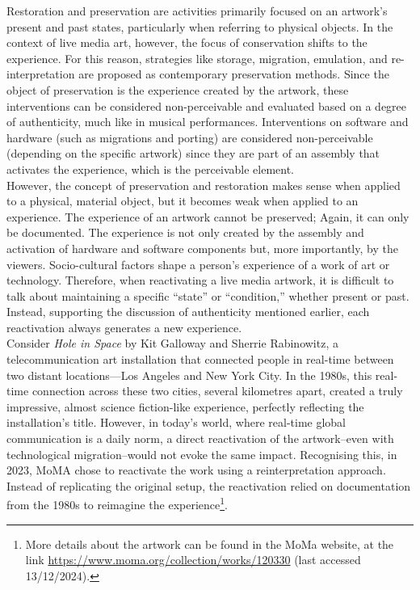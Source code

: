 Restoration and preservation are activities primarily focused on an artwork's present and past states, particularly when referring to physical objects. In the context of live media art, however, the focus of conservation shifts to the experience. For this reason, strategies like storage, migration, emulation, and re-interpretation are proposed as contemporary preservation methods. Since the object of preservation is the experience created by the artwork, these interventions can be considered non-perceivable and evaluated based on a degree of authenticity, much like in musical performances. Interventions on software and hardware (such as migrations and porting) are considered non-perceivable (depending on the specific artwork) since they are part of an assembly that activates the experience, which is the perceivable element.\\
However, the concept of preservation and restoration makes sense when applied to a physical, material object, but it becomes weak when applied to an experience. The experience of an artwork cannot be preserved; Again, it can only be documented. The experience is not only created by the assembly and activation of hardware and software components but, more importantly, by the viewers. Socio-cultural factors shape a person's experience of a work of art or technology. Therefore, when reactivating a live media artwork, it is difficult to talk about maintaining a specific ``state'' or ``condition,'' whether present or past. Instead, supporting the discussion of authenticity mentioned earlier, each reactivation always generates a new experience.\\
Consider \textit{Hole in Space} by Kit Galloway and Sherrie Rabinowitz, a telecommunication art installation that connected people in real-time between two distant locations—Los Angeles and New York City. In the 1980s, this real-time connection across these two cities, several kilometres apart, created a truly impressive, almost science fiction-like experience, perfectly reflecting the installation’s title. However, in today’s world, where real-time global communication is a daily norm, a direct reactivation of the artwork–even with technological migration–would not evoke the same impact. Recognising this, in 2023, MoMA chose to reactivate the work using a reinterpretation approach. Instead of replicating the original setup, the reactivation relied on documentation from the 1980s to reimagine the experience\footnote{More details about the artwork can be found in the MoMa website, at the link \url{https://www.moma.org/collection/works/120330} (last accessed 13/12/2024).}.\\
